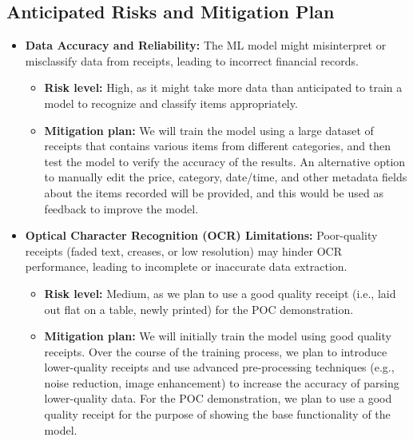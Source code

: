 \documentclass{article}
\begin{document}
\subsection{Anticipated Risks and Mitigation Plan}

\begin{itemize}
    \item \textbf{Data Accuracy and Reliability:} The ML model might
    misinterpret or misclassify data from receipts, leading to incorrect
    financial records.
    \begin{itemize}
        \item \textbf{Risk level:} High, as it might take more data than
        anticipated to train a model to recognize and classify items
        appropriately.
        \item \textbf{Mitigation plan:} We will train the model using a large
        dataset of receipts that contains various items from different
        categories, and then test the model to verify the accuracy of the
        results. An alternative option to manually edit the price, category,
        date/time, and other metadata fields about the items recorded will be
        provided, and this would be used as feedback to improve the model.
    \end{itemize}

    \item \textbf{Optical Character Recognition (OCR) Limitations:} Poor-quality
    receipts (faded text, creases, or low resolution) may hinder OCR
    performance, leading to incomplete or inaccurate data extraction.
     \begin{itemize}
        \item \textbf{Risk level:} Medium, as we plan to use a good quality
         receipt (i.e., laid out flat on a table, newly printed) for the POC
         demonstration.
        \item \textbf{Mitigation plan:} We will initially train the model using
        good quality receipts. Over the course of the training process, we plan
        to introduce lower-quality receipts and use advanced pre-processing
        techniques (e.g., noise reduction, image enhancement) to increase the
        accuracy of parsing lower-quality data. For the POC demonstration, we
        plan to use a good quality receipt for the purpose of showing the base
        functionality of the model.
    \end{itemize}
    

\end{itemize}
\end{document}
